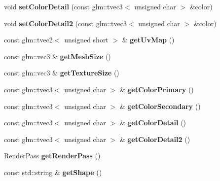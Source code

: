 \begin{DoxyCompactItemize}
void {\bfseries set\+Color\+Detail} (const glm\+::tvec3$<$ unsigned char $>$ \&color)
\item 
\mbox{\label{classTarbora_1_1MeshNode_a99c9d41bdbaacb28e464685e2fb0234b}} 
void {\bfseries set\+Color\+Detail2} (const glm\+::tvec3$<$ unsigned char $>$ \&color)
\item 
\mbox{\label{classTarbora_1_1MeshNode_ab85533b2df1604ac9271f51a28107858}} 
const glm\+::tvec2$<$ unsigned short $>$ \& {\bfseries get\+Uv\+Map} ()
\item 
\mbox{\label{classTarbora_1_1MeshNode_aa2f81f5004d3078f73175a63b0703492}} 
const glm\+::vec3 \& {\bfseries get\+Mesh\+Size} ()
\item 
\mbox{\label{classTarbora_1_1MeshNode_a8825bb0adb903b1817d3faff926d1a13}} 
const glm\+::vec3 \& {\bfseries get\+Texture\+Size} ()
\item 
\mbox{\label{classTarbora_1_1MeshNode_a43cb669adccd8cdeba8c449b96fb10f4}} 
const glm\+::tvec3$<$ unsigned char $>$ \& {\bfseries get\+Color\+Primary} ()
\item 
\mbox{\label{classTarbora_1_1MeshNode_a2ee7aee12aa9833ed65b8c53bfab64d0}} 
const glm\+::tvec3$<$ unsigned char $>$ \& {\bfseries get\+Color\+Secondary} ()
\item 
\mbox{\label{classTarbora_1_1MeshNode_acd86779d43bc4d304b61837b264bed08}} 
const glm\+::tvec3$<$ unsigned char $>$ \& {\bfseries get\+Color\+Detail} ()
\item 
\mbox{\label{classTarbora_1_1MeshNode_ae0265cd2d74ec321c0bee040abce9359}} 
const glm\+::tvec3$<$ unsigned char $>$ \& {\bfseries get\+Color\+Detail2} ()
\item 
\mbox{\label{classTarbora_1_1MeshNode_a84bc23514bf0faa9d6b75216185f83c8}} 
Render\+Pass {\bfseries get\+Render\+Pass} ()
\item 
\mbox{\label{classTarbora_1_1MeshNode_ae3b11a8e2956a25bb962271c8e0a2078}} 
const std\+::string \& {\bfseries get\+Shape} ()
\end{DoxyCompactItemize}
